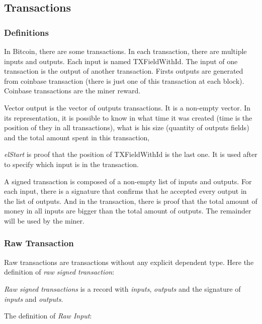 \subsection{Transactions}

\subsubsection{Definitions}

In Bitcoin, there are some transactions.
In each transaction, there are multiple inputs and outputs.
Each input is named TXFieldWithId.
The input of one transaction is the output of another transaction.
Firsts outputs are generated from coinbase transaction (there is just one of this transaction at
each block).
Coinbase transactions are the miner reward.


Vector output is the vector of outputs transactions.
It is a non-empty vector.
In its representation, it is possible to know in what time it was created (time is the position of
they in all transactions),
what is his size (quantity of outputs fields)
and the total amount spent in this transaction,

\emph{elStart} is proof that the position of TXFieldWithId is the last one.
It is used after to specify which input is in the transaction.


A signed transaction is composed of a non-empty list of inputs and outputs.
For each input, there is a signature that confirms that he accepted every output in the list of outputs.
And in the transaction, there is proof that the total amount of money in all inputs are bigger than
the total amount of outputs.
The remainder will be used by the miner.

\subsubsection{Raw Transaction}

Raw transactions are transactions without any explicit dependent type.
Here the definition of \emph{raw signed transaction}:


\emph{Raw signed transactions} is a record with \emph{inputs}, \emph{outputs}
and the signature of \emph{inputs} and \emph{outputs}.

The definition of \emph{Raw Input}:

